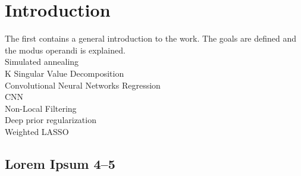 \chapter{Introduction}
\label{cha:intro}
The first contains a general introduction to the work. The goals are
defined and the modus operandi is explained. \\

Simulated annealing \cite{SAM-HIT} \\

K Singular Value Decomposition \cite{K-SVD} \\

Convolutional Neural Networks Regression \cite{CNN-Reg} \\

CNN \cite{CNN} \\

Non-Local Filtering \cite{Non-Local_Filtering} \\

Deep prior regularization \cite{deep_prior} \\

Weighted LASSO \cite{LASSO}


\section{Lorem Ipsum 4--5}
\lipsum[4-5]

